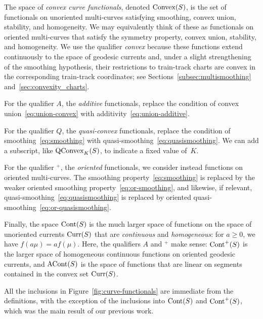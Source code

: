 \begin{definition}
  \label{def:functional-variations}
  The space of \emph{convex curve functionals}, denoted $\mathrm{Convex}(S)$,
  is the set of functionals on unoriented multi-curves satisfying smoothing,
  convex union, stability, and homogeneity. We may equivalently think
  of these as functionals on oriented multi-curves that satisfy the symmetry
  property, convex union, stability, and homogeneity.
  We use the qualifier \emph{convex} because these functions extend
  continuously to the space of geodesic currents and, under a slight
  strengthening of the smoothing hypothesis, their restrictions to
  train-track charts are convex in the corresponding train-track
  coordinates; see Sections~\ref{subsec:multismoothing}
  and~\ref{sec:convexity_charts}.

  For the qualifier $A$, the \emph{additive} functionals, replace the
  condition of convex union~\eqref{eq:union-convex} with
  additivity~\eqref{eq:union-additive}.

  For the qualifier $Q$, the \emph{quasi-convex} functionals, replace
  the condition of smoothing~\eqref{eq:smoothing} with
  quasi-smoothing~\eqref{eq:quasismoothing}.
  We can add a subscript, like $\mathrm{QConvex}_K(S)$, to
  indicate a fixed value of~$K$.

  For the qualifier ${}^+$, the \emph{oriented} functionals, we
  consider instead functions on oriented multi-curves. The smoothing
  property~\eqref{eq:smoothing} is replaced by the weaker oriented
  smoothing property~\eqref{eq:or-smoothing}, and likewise, if relevant,
  quasi-smoothing~\eqref{eq:quasismoothing} is replaced by oriented
  quasi-smoothing~\eqref{eq:or-quasismoothing}.

  Finally, the space $\mathrm{Cont}(S)$ is the much larger space of functions on the
  space of unoriented currents $\operatorname{Curr}(S)$ that are \emph{continuous}
  and \emph{homogeneous}: for $a \ge 0$, we have
  $f(a\mu) = a f(\mu)$.
  Here, the qualifiers $A$ and ${}^+$ make sense:
  $\mathrm{Cont}^+(S)$ is the larger space of homogeneous continuous functions on oriented
  geodesic currents, and $\mathrm{ACont}(S)$ is the space of functions that
  are linear on segments contained in the convex set $\operatorname{Curr}(S)$.
\end{definition}

All the inclusions in Figure~\ref{fig:curve-functionals} are immediate
from the definitions, with the
exception of the inclusions into $\mathrm{Cont}(S)$ and $\mathrm{Cont}^+(S)$, which
was the main result of our previous work.

